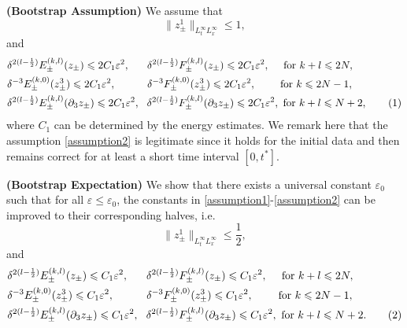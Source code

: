 \documentclass[10pt,reqno]{amsart}
\numberwithin{equation}{section}
\begin{document}
\textbf{(Bootstrap Assumption)} We assume that 
\begin{equation}\label{assumption1}
	\|z_\pm^1\|_{L^\infty_tL^\infty_x}\leqslant 1,
\end{equation}
and 
\begin{align*}
	&\delta^{2(l-\frac{1}{2})}E_\pm^{(k,l)}(z_\pm)\leqslant 2C_1\varepsilon^2,\ \ \ \ \ \delta^{2(l-\frac{1}{2})}F_\pm^{(k,l)}(z_\pm)\leqslant 2C_1\varepsilon^2,\ \ \ \ \text{for }k+l\leqslant 2N,\\
	&\delta^{-3}E_\pm^{(k,0)}(z_\pm^3)\leqslant 2C_1\varepsilon^2,\ \ \ \ \ \ \ \ \  \delta^{-3}F_\pm^{(k,0)}(z_\pm^3)\leqslant 2C_1\varepsilon^2,\ \ \ \ \ \  \ \text{for }k\leqslant 2N-1,\\
	&\delta^{2(l-\frac{1}{2})}E_\pm^{(k,l)}(\partial_3z_\pm)\leqslant 2C_1\varepsilon^2,\ \  \delta^{2(l-\frac{1}{2})}F_\pm^{(k,l)}(\partial_3z_\pm)\leqslant 2C_1\varepsilon^2,\ \text{for }k+l\leqslant N+2,\stepcounter{equation}\tag{\theequation}\label{assumption2}
\end{align*}
where $C_1$ can be determined by the energy estimates. We remark here that the assumption \eqref{assumption2} is legitimate since  
it holds for the initial data and then remains correct for at least a short time interval $[0,t^*]$.
 

\textbf{(Bootstrap Expectation)} We show that   
there exists a universal constant   $\varepsilon_0$ such that for all $\varepsilon\leqslant \varepsilon_0$, the constants in \eqref{assumption1}-\eqref{assumption2} can be improved to their corresponding halves, i.e. 
\begin{equation}\label{improve1}
	\|z_\pm^1\|_{L^\infty_tL^\infty_x}\leqslant \frac{1}{2},
\end{equation}
and 
\begin{align*}
	&\delta^{2(l-\frac{1}{2})}E_\pm^{(k,l)}(z_\pm)\leqslant C_1\varepsilon^2,\ \ \ \ \  \delta^{2(l-\frac{1}{2})}F_\pm^{(k,l)}(z_\pm)\leqslant C_1\varepsilon^2,\ \ \ \ \text{for }k+l\leqslant 2N,\\
	&\delta^{-3}E_\pm^{(k,0)}(z_\pm^3)\leqslant C_1\varepsilon^2,\ \ \ \ \ \ \ \ \  \delta^{-3}F_\pm^{(k,0)}(z_\pm^3)\leqslant C_1\varepsilon^2,\ \ \ \ \ \ \ \text{for }k\leqslant 2N-1,\\
	&\delta^{2(l-\frac{1}{2})}E_\pm^{(k,l)}(\partial_3z_\pm)\leqslant C_1\varepsilon^2,\ \  \delta^{2(l-\frac{1}{2})}F_\pm^{(k,l)}(\partial_3z_\pm)\leqslant C_1\varepsilon^2,\ \text{for }k+l\leqslant N+2.\stepcounter{equation}\tag{\theequation}\label{improve2}
\end{align*}
\end{document}
